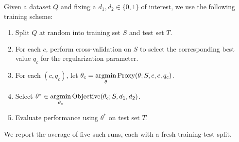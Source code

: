 Given a dataset $Q$ and fixing a $d_1, d_2 \in \{0, 1\}$ of interest, we use the following training scheme:
\begin{enumerate}
\item Split $Q$ at random into training set $S$ and test set $T$.
\item For each $c$, perform cross-validation on $S$ to select the corresponding best value $q_c$ for the regularization parameter.
\item For each $(c,q_c)$, let $\theta_c = \operatorname*{argmin}\limits_{\theta} \text{Proxy}(\theta;S,c,c,q_c)$.
\item Select $\theta^* \in \operatorname*{argmin}\limits_{\theta_c} \text{Objective}(\theta_c;S,d_1,d_2)$.
\item Evaluate performance using $\theta^*$ on test set $T$.
\end{enumerate}
We report the average of five such runs, each with a fresh training-test split.








